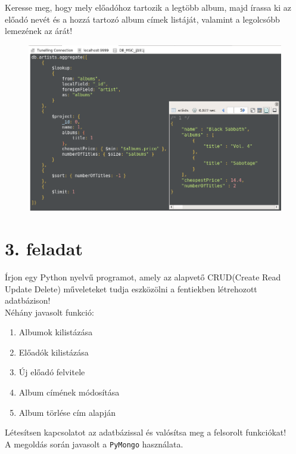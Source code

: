 \documentclass[a4paper, 12pt]{article}
\begin{document}
\noindent Keresse meg, hogy mely előadóhoz tartozik a legtöbb album, majd írassa ki az előadó nevét és a hozzá tartozó album címek listáját, valamint a legolcsóbb lemezének az árát!
\begin{figure}[!hb]
	\centering
	\includegraphics[scale = 0.53]{images/2_e4.png}
	\label{fig:2_e4}
\end{figure}	
\clearpage

\section*{3. feladat}
Írjon egy Python nyelvű programot, amely az alapvető CRUD(Create Read Update Delete) műveleteket tudja eszközölni a fentiekben létrehozott adatbázison!\\
Néhány javasolt funkció:
\begin{enumerate}
	\item Albumok kilistázása
	\item Előadók kilistázása
	\item Új előadó felvitele
	\item Album címének módosítása
	\item Album törlése cím alapján
\end{enumerate}
Létesítsen kapcsolatot az adatbázissal és valósítsa meg a felsorolt funkciókat!\\
A megoldás során javasolt a \texttt{PyMongo} használata.
\newpage
\end{document}
